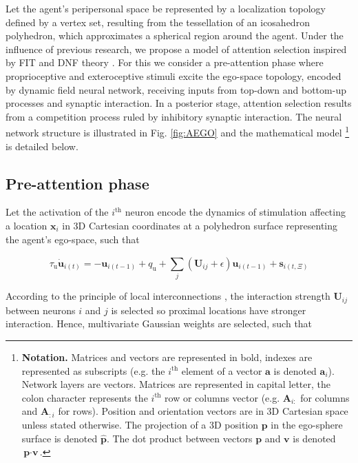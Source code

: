 \documentclass[letterpaper, 10 pt, conference]{ieeeconf}  %
\begin{document}
	Let the agent's peripersonal space be represented by a localization topology defined by a vertex set, resulting from the tessellation of an icosahedron polyhedron, which approximates a spherical region around the agent. Under the influence of previous research, we propose a model of attention selection inspired by FIT and DNF theory \cite{amari1977}. For this we consider a pre-attention phase where proprioceptive and exteroceptive stimuli excite the ego-space topology, encoded by dynamic field neural network, receiving inputs from top-down and bottom-up processes and synaptic interaction. In a posterior stage, attention selection results from a competition process ruled by inhibitory synaptic interaction. The neural network structure is illustrated in Fig. \ref{fig:AEGO} and the mathematical model \footnote{\scriptsize \textbf{Notation.} Matrices and vectors are represented in bold, indexes are represented as subscripts (e.g. the $i^{\mathrm{th}}$ element of a vector $\mathbf{a}$ is denoted $\mathbf{a}_{i}$). Network layers are vectors. Matrices are represented in capital letter, the colon character represents the $i^{\mathrm{th}}$ row or columns vector (e.g. $\mathbf{A}_{i:}$ for columns and $\mathbf{A}_{:i}$ for rows). Position and orientation vectors are in 3D Cartesian space unless stated otherwise. The projection of a 3D position $\mathbf{p}$ in the ego-sphere surface is denoted $\mathbf{\hat{p}}$. The dot product between vectors $\textbf{p}$ and $\textbf{v}$ is denoted $\textbf{p}\cdot\textbf{v}$.} is detailed below.
	
	
	\subsection{Pre-attention phase}
	Let the activation of the $i^\mathrm{th}$ neuron encode the dynamics of stimulation affecting a location  $\mathbf{x}_i$ in 3D Cartesian coordinates at a polyhedron surface representing the agent's ego-space, such that 
		
	\begin{equation}
	\tau_\mathrm{u} \dot{\mathbf{u}}_{i(t)} = -\mathbf{u}_{i(t-1)} + q_\mathrm{u} + \sum_{j}^{} (\mathbf{U}_{ij}+\epsilon)\mathbf{u}_{i(t-1)} + \mathbf{s}_{i(t,\Xi)} 
	\label{eq:pre-sel}
	\end{equation}

	According to the principle of local interconnections \cite{samsonovich97}, the interaction strength $\mathbf{U}_{ij}$ between neurons $i$ and $j$ is selected so proximal locations have stronger interaction. Hence, multivariate Gaussian weights are selected, such that
	
\end{document}
